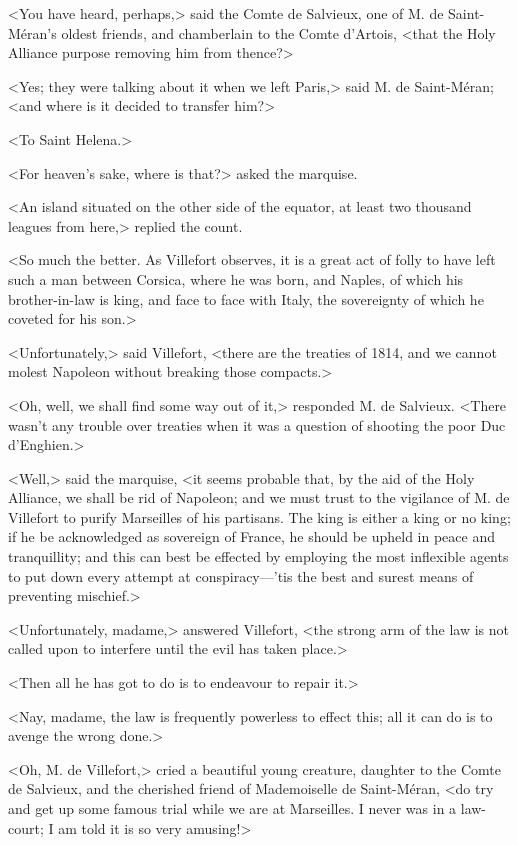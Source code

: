  <You have heard, perhaps,> said the Comte de Salvieux, one of M. de Saint-Méran's oldest friends, and chamberlain to the Comte d'Artois, <that the Holy Alliance purpose removing him from thence?> 

 <Yes; they were talking about it when we left Paris,> said M. de Saint-Méran; <and where is it decided to transfer him?> 

 <To Saint Helena.> 

 <For heaven's sake, where is that?> asked the marquise. 

 <An island situated on the other side of the equator, at least two thousand leagues from here,> replied the count. 

 <So much the better. As Villefort observes, it is a great act of folly to have left such a man between Corsica, where he was born, and Naples, of which his brother-in-law is king, and face to face with Italy, the sovereignty of which he coveted for his son.> 

 <Unfortunately,> said Villefort, <there are the treaties of 1814, and we cannot molest Napoleon without breaking those compacts.> 

 <Oh, well, we shall find some way out of it,> responded M. de Salvieux. <There wasn't any trouble over treaties when it was a question of shooting the poor Duc d'Enghien.> 

 <Well,> said the marquise, <it seems probable that, by the aid of the Holy Alliance, we shall be rid of Napoleon; and we must trust to the vigilance of M. de Villefort to purify Marseilles of his partisans. The king is either a king or no king; if he be acknowledged as sovereign of France, he should be upheld in peace and tranquillity; and this can best be effected by employing the most inflexible agents to put down every attempt at conspiracy—'tis the best and surest means of preventing mischief.> 

 <Unfortunately, madame,> answered Villefort, <the strong arm of the law is not called upon to interfere until the evil has taken place.> 

 <Then all he has got to do is to endeavour to repair it.> 

 <Nay, madame, the law is frequently powerless to effect this; all it can do is to avenge the wrong done.> 

 <Oh, M. de Villefort,> cried a beautiful young creature, daughter to the Comte de Salvieux, and the cherished friend of Mademoiselle de Saint-Méran, <do try and get up some famous trial while we are at Marseilles. I never was in a law-court; I am told it is so very amusing!> 

